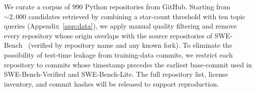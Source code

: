We curate a corpus of $990$ Python repositories from GitHub. Starting from
$\sim\!2{,}000$ candidates retrieved by combining a star-count threshold with
ten topic queries (Appendix~\ref{app:data}), we apply manual quality filtering
and remove every repository whose origin overlaps with the source repositories
of SWE-Bench~\citep{swebench} (verified by repository name and any known
fork). To eliminate the possibility of test-time leakage from training-data
commits, we restrict each repository to commits whose timestamp precedes the
earliest base-commit used in SWE-Bench-Verified and SWE-Bench-Lite. The full
repository list, license inventory, and commit hashes will be released to
support reproduction.

